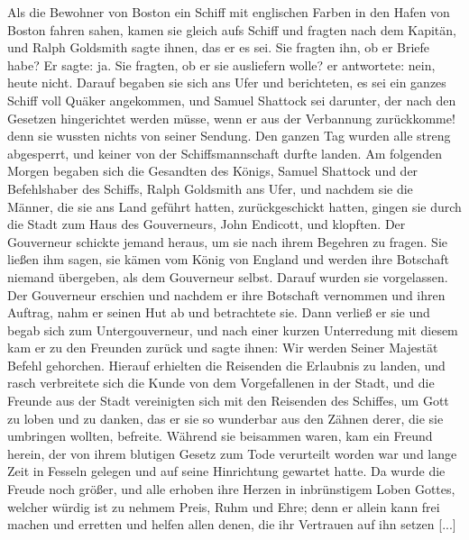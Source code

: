 Als die Bewohner von Boston ein Schiff mit englischen
Farben in den Hafen von Boston fahren sahen, kamen sie
gleich aufs Schiff und fragten nach dem Kapitän, und Ralph
Goldsmith sagte ihnen, das er es sei. Sie fragten ihn, ob er
Briefe habe? Er sagte: \glqq ja\grqq{}. Sie fragten, ob er sie 
ausliefern wolle? er antwortete: \glqq nein, heute nicht.\grqq{} 
Darauf begaben sie sich ans Ufer und berichteten, es sei 
ein ganzes Schiff voll Quäker angekommen, und Samuel Shattock 
sei darunter, der nach den Gesetzen hingerichtet werden müsse, 
wenn er aus der Verbannung zurückkomme! denn sie wussten nichts 
von seiner Sendung. Den ganzen Tag wurden alle streng abgesperrt, 
und keiner von der Schiffsmannschaft durfte landen. Am 
folgenden Morgen begaben sich die Gesandten des Königs, 
Samuel Shattock und der Befehlshaber des Schiffs, Ralph 
Goldsmith ans Ufer, und nachdem sie die Männer, die sie ans 
Land geführt hatten, zurückgeschickt hatten,
gingen sie durch die Stadt zum Haus des Gouverneurs, John
Endicott, und klopften. Der Gouverneur schickte jemand heraus,
um sie nach ihrem Begehren zu fragen. Sie ließen ihm sagen,
sie kämen vom König von England und werden ihre Botschaft
niemand übergeben, als dem Gouverneur selbst. Darauf wurden
sie vorgelassen. Der Gouverneur erschien und nachdem er ihre
Botschaft vernommen und ihren Auftrag, nahm er seinen Hut ab
und betrachtete sie. Dann verließ er sie und begab sich zum
Untergouverneur, und nach einer kurzen Unterredung mit diesem
kam er zu den Freunden zurück und sagte ihnen: \glqq Wir
werden Seiner Majestät Befehl gehorchen.\grqq{} Hierauf erhielten
die Reisenden die Erlaubnis zu landen, und rasch verbreitete sich
die Kunde von dem Vorgefallenen in der Stadt, und die Freunde
aus der Stadt vereinigten sich mit den Reisenden des Schiffes,
um Gott zu loben und zu danken, das er sie so wunderbar aus
den Zähnen derer, die sie umbringen wollten, befreite. Während
sie beisammen waren, kam ein Freund herein, der von ihrem
blutigen Gesetz zum Tode verurteilt worden war und lange Zeit
in Fesseln gelegen und auf seine Hinrichtung gewartet hatte. Da
wurde die Freude noch größer, und alle erhoben ihre Herzen in
inbrünstigem Loben Gottes, welcher würdig ist zu nehmem Preis,
Ruhm und Ehre; denn er allein kann frei machen und erretten
und helfen allen denen, die ihr Vertrauen auf ihn setzen [...]

